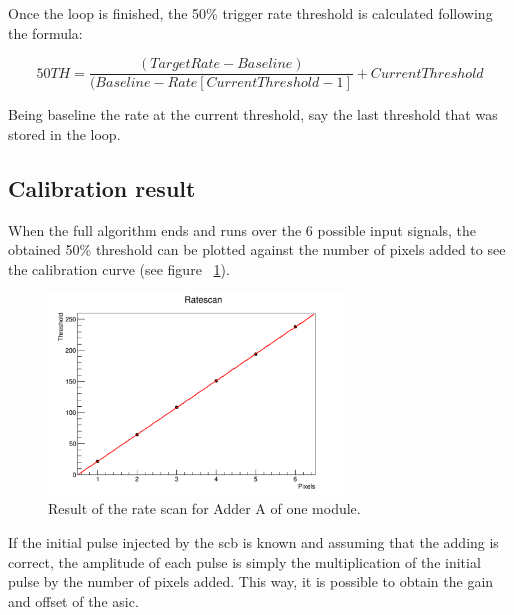 \documentclass[main.tex]{subfiles}
\begin{document}
Once the loop is finished, the 50\% trigger rate threshold is calculated following the formula:

\begin{equation}
  50TH = \frac{(Target Rate-Baseline)}{(Baseline-Rate[Current Threshold-1]} + Current Threshold
\end{equation}

Being baseline the rate at the current threshold, say the last threshold that was stored in the loop.

\subsection{Calibration result}

When the full algorithm ends and runs over the 6 possible input signals, the obtained 50\% threshold can be plotted against the number of pixels added to see the calibration curve (see figure ~\ref{fig:calibcurve}).

\begin{figure}[h]
  \centering
  \includegraphics[width=0.7\textwidth]{./Pictures/calibcurve.pdf}
  \caption{Result of the rate scan for Adder A of one module.}
  \label{fig:calibcurve}
\end{figure}

If the initial pulse injected by the \gls{scb} is known and assuming that the adding is correct, the amplitude of each pulse is simply the multiplication of the initial pulse by the number of pixels added. This way, it is possible to obtain the gain and offset of the \gls{asic}.
\end{document}
